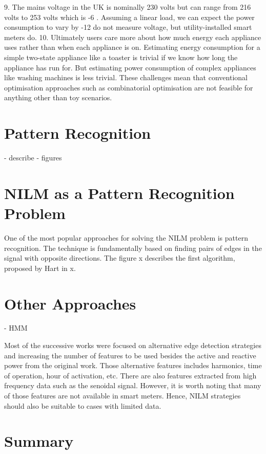 9. The mains voltage in the UK is nominally 230 volts but can range from 216 volts to
253 volts which is -6%
. Assuming a linear
load, we can expect the power consumption to vary by -12%
do not measure voltage, but utility-installed smart meters do.
10. Ultimately users care more about how much energy each appliance uses rather than when
each appliance is on. Estimating energy consumption for a simple two-state appliance
like a toaster is trivial if we know how long the appliance has run for. But estimating
power consumption of complex appliances like washing machines is less trivial.
These challenges mean that conventional optimisation approaches such as combinatorial optimisation
are not feasible for anything other than toy scenarios.


\fi

\section{Pattern Recognition}
- describe
- figures 

\section{NILM as a Pattern Recognition Problem}
One of the most popular approaches for solving the NILM problem is pattern recognition. The technique is fundamentally based on finding pairs of edges in the signal with opposite directions. The figure x describes the first algorithm, proposed by Hart in x. 

\section{Other Approaches}
- HMM


Most of the successive works were focused on alternative edge detection strategies and increasing the number of features to be used besides the active and reactive power from the original work. Those alternative features includes harmonics, time of operation, hour of activation, etc. There are also features extracted from high frequency data such as the senoidal signal. However, it is worth noting that many of those features are not available in smart meters. Hence, NILM strategies should also be suitable to cases with limited data. 

\section{Summary}